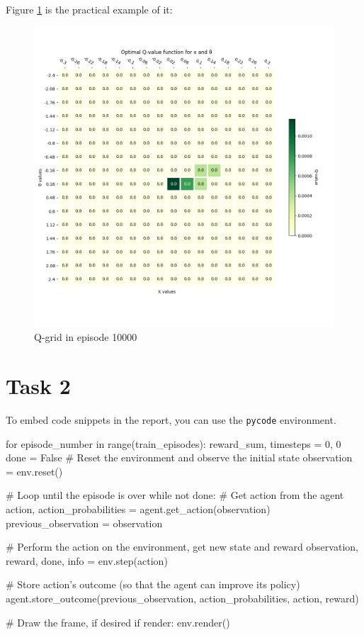 \documentclass[12pt]{article}
\begin{document}
Figure \ref{fig:q-1-3} is the practical example of it:

\begin{figure}[h]
    \centering
    \includegraphics[scale=0.25]{exercise-3/plots/heatmap-fixed-0.2-ep-1.png}
    \caption{Q-grid in episode 10000}
    \label{fig:q-1-3}
\end{figure}

\section{Task 2}
To embed code snippets in the report, you can use the \texttt{pycode} environment.

\begin{pycode}
for episode_number in range(train_episodes):
    reward_sum, timesteps = 0, 0
    done = False
    # Reset the environment and observe the initial state
    observation = env.reset()

    # Loop until the episode is over
    while not done:
        # Get action from the agent
        action, action_probabilities = agent.get_action(observation)
        previous_observation = observation

        # Perform the action on the environment, get new state and reward
        observation, reward, done, info = env.step(action)

        # Store action's outcome (so that the agent can improve its policy)
        agent.store_outcome(previous_observation, action_probabilities, action, reward)

        # Draw the frame, if desired
        if render:
            env.render()
\end{pycode}
\end{document}
